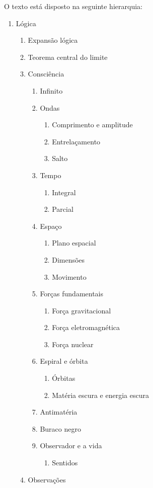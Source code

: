 \noindent O texto está disposto na seguinte hierarquia:
	{\scriptsize
	\begin{enumerate}[label*=\arabic*.]
	   \item Lógica
	   \begin{enumerate}[label*=\arabic*.]
		   \item Expansão lógica
		   \item Teorema central do limite
		   \item Consciência
			   \begin{enumerate}[label*=\arabic*.]
				   \item Infinito
				   \item Ondas 
				   \begin{enumerate}[label*=\arabic*.]
				   		\item Comprimento e amplitude
				   		\item Entrelaçamento
				   		\item Salto
				   \end{enumerate}  
				   \item Tempo
				   \begin{enumerate}[label*=\arabic*.]
				   		\item Integral
				   		\item Parcial 
				   \end{enumerate}  
				   \item Espaço 
				   \begin{enumerate}[label*=\arabic*.]
				   		\item Plano espacial 
				   		\item Dimensões 
				   		\item Movimento
				   \end{enumerate}  
				   \item Forças fundamentais
				   \begin{enumerate}[label*=\arabic*.]
				   		\item Força gravitacional
				   		\item Força eletromagnética
				   		\item Força nuclear
				   \end{enumerate}  
				   \item Espiral e órbita
				   \begin{enumerate}[label*=\arabic*.]
					   \item Órbitas
				   		\item Matéria escura e energia escura
				   \end{enumerate} 
				   \item Antimatéria
				   \item Buraco negro
				   \item Observador e a vida
				   \begin{enumerate}[label*=\arabic*.]
				   		\item Sentidos
				   \end{enumerate}  
			   \end{enumerate}   
			   \item Observações
	   \end{enumerate}
	\end{enumerate}
	}

